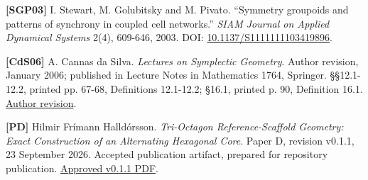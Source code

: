 \documentclass[
  11pt,
  a4paper,
]{article}
\begin{document}
\textbf{{[}SGP03{]}} I. Stewart, M. Golubitsky and M. Pivato. ``Symmetry groupoids and patterns of synchrony in coupled cell networks.'' \emph{SIAM Journal on Applied Dynamical Systems} 2(4), 609-646, 2003. DOI: \href{https://doi.org/10.1137/S1111111103419896}{10.1137/S1111111103419896}.

\textbf{{[}CdS06{]}} A. Cannas da Silva. \emph{Lectures on Symplectic Geometry}. Author revision, January 2006; published in Lecture Notes in Mathematics 1764, Springer. §§12.1-12.2, printed pp. 67-68, Definitions 12.1-12.2; §16.1, printed p. 90, Definition 16.1. \href{https://people.math.ethz.ch/~acannas/Papers/lsg.pdf}{Author revision}.

\textbf{{[}PD{]}} Hilmir Frímann Halldórsson. \emph{Tri-Octagon Reference-Scaffold Geometry: Exact Construction of an Alternating Hexagonal Core}. Paper D, revision v0.1.1, 23 September 2026. Accepted publication artifact, prepared for repository publication. \href{../../../PAPER_D/v0.1.1/publication/PAPER_D_REFERENCE_SCAFFOLD_v0.1.1.pdf}{Approved v0.1.1 PDF}.
\end{document}
